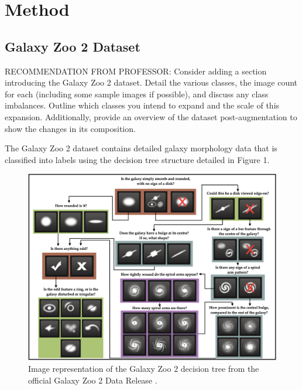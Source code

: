 \documentclass[10pt,twocolumn,letterpaper]{article}
\begin{document}
\section{Method}
\subsection{Galaxy Zoo 2 Dataset}
RECOMMENDATION FROM PROFESSOR:
Consider adding a section introducing the Galaxy Zoo 2 dataset. 
Detail the various classes, the image count for each (including some sample images if possible), and discuss any class imbalances. 
Outline which classes you intend to expand and the scale of this expansion. 
Additionally, provide an overview of the dataset post-augmentation to show the changes in its composition.

The Galaxy Zoo 2 dataset contains detailed galaxy morphology data that is classified into labels using the decision tree structure detailed in Figure 1.
\begin{figure}[htbp]
    \includegraphics[width=\linewidth]{decision_tree.png}
    \caption{Image representation of the Galaxy Zoo 2 decision tree from the official Galaxy Zoo 2 Data Release \cite{Willett13}.}
    \label{fig:decisiontree}
  \end{figure}
\end{document}
